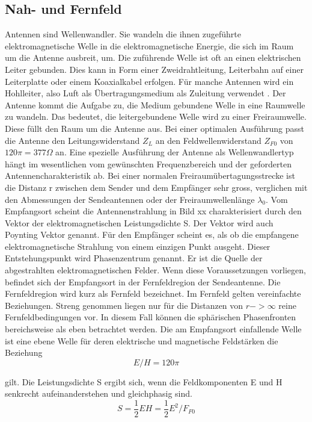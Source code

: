\subsection{Nah- und Fernfeld}
Antennen sind Wellenwandler. Sie wandeln die ihnen zugeführte elektromagnetische Welle in die elektromagnetische Energie, die sich im Raum um die Antenne ausbreit, um. Die zuführende Welle ist oft an einen elektrischen Leiter gebunden. Dies kann in Form einer Zweidrahtleitung, Leiterbahn auf einer Leiterplatte oder einem Koaxialkabel erfolgen.  Für manche Antennen wird ein Hohlleiter, also Luft als Übertragungsmedium als Zuleitung verwendet . 
Der Antenne kommt die Aufgabe zu, die Medium gebundene Welle in eine Raumwelle zu wandeln. Das bedeutet, die leitergebundene Welle wird zu einer Freiraumwelle. Diese füllt den Raum um die Antenne aus. 
Bei einer optimalen Ausführung passt die Antenne den Leitungswiderstand $Z_{L}$ an den Feldwellenwiderstand $Z_{F0}$ von $120\pi = 377 \Omega$ an.
Eine spezielle Ausführung der Antenne als Wellenwandlertyp hängt im wesentlichen vom gewünschten Frequenzbereich und der geforderten Antennencharakteristik ab. Bei einer normalen Freiraumübertagungsstrecke ist die Distanz r zwischen dem Sender und dem Empfänger sehr gross, verglichen mit den Abmessungen der Sendeantennen oder der Freiraumwellenlänge $\lambda_{0}$. Vom Empfangsort scheint die Antennenstrahlung in Bild xx charakterisiert durch den Vektor der elektromagnetischen Leistungsdichte S. Der Vektor  wird auch Poynting Vektor genannt. Für den Empfänger scheint es, als ob die empfangene elektromagnetische Strahlung von einem einzigen Punkt ausgeht. Dieser Entstehungspunkt wird Phasenzentrum genannt. Er ist die Quelle der abgestrahlten elektromagnetischen Felder. Wenn diese Voraussetzungen vorliegen, befindet sich der Empfangsort in der Fernfeldregion der Sendeantenne. Die Fernfeldregion wird kurz als Fernfeld bezeichnet. 
Im Fernfeld gelten vereinfachte Beziehungen. Streng genommen liegen nur für die Distanzen von $r->\infty$ reine Fernfeldbedingungen vor. In diesem Fall können die sphärischen Phasenfronten  bereichsweise als eben betrachtet werden. Die am Empfangsort einfallende Welle ist eine ebene Welle für deren elektrische und magnetische Feldstärken die Beziehung \cite{meinke1992taschenbuch}
\begin{equation}
E/H=120\pi\label{eq:WellenimpedanuE/H}
\end{equation}

gilt. Die Leistungsdichte S ergibt sich, wenn die Feldkomponenten E  und H senkrecht aufeinanderstehen und gleichphasig sind.
\begin{equation}
S=\dfrac{1}{2}EH=\dfrac{1}{2} E^{2}/F_{F0}\label{eq:LeistungsdichteS}
\end{equation}


